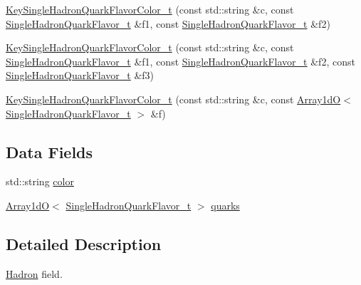 \begin{DoxyCompactItemize}
\item 
\mbox{\hyperlink{structHadron_1_1KeySingleHadronQuarkFlavorColor__t_a1a1acbb421e0eee78a6102a9dc7027b6}{Key\+Single\+Hadron\+Quark\+Flavor\+Color\+\_\+t}} (const std\+::string \&c, const \mbox{\hyperlink{structHadron_1_1SingleHadronQuarkFlavor__t}{Single\+Hadron\+Quark\+Flavor\+\_\+t}} \&f1, const \mbox{\hyperlink{structHadron_1_1SingleHadronQuarkFlavor__t}{Single\+Hadron\+Quark\+Flavor\+\_\+t}} \&f2)
\item 
\mbox{\hyperlink{structHadron_1_1KeySingleHadronQuarkFlavorColor__t_aa59b67de7070dc5fcab6ef768af7069e}{Key\+Single\+Hadron\+Quark\+Flavor\+Color\+\_\+t}} (const std\+::string \&c, const \mbox{\hyperlink{structHadron_1_1SingleHadronQuarkFlavor__t}{Single\+Hadron\+Quark\+Flavor\+\_\+t}} \&f1, const \mbox{\hyperlink{structHadron_1_1SingleHadronQuarkFlavor__t}{Single\+Hadron\+Quark\+Flavor\+\_\+t}} \&f2, const \mbox{\hyperlink{structHadron_1_1SingleHadronQuarkFlavor__t}{Single\+Hadron\+Quark\+Flavor\+\_\+t}} \&f3)
\item 
\mbox{\hyperlink{structHadron_1_1KeySingleHadronQuarkFlavorColor__t_aa894166327f6565a8ec49fd863dadf47}{Key\+Single\+Hadron\+Quark\+Flavor\+Color\+\_\+t}} (const std\+::string \&c, const \mbox{\hyperlink{classADAT_1_1Array1dO}{Array1dO}}$<$ \mbox{\hyperlink{structHadron_1_1SingleHadronQuarkFlavor__t}{Single\+Hadron\+Quark\+Flavor\+\_\+t}} $>$ \&f)
\end{DoxyCompactItemize}
\subsection*{Data Fields}
\begin{DoxyCompactItemize}
\item 
std\+::string \mbox{\hyperlink{structHadron_1_1KeySingleHadronQuarkFlavorColor__t_aa5dc10dee689bef8e65d2b9230efdc85}{color}}
\item 
\mbox{\hyperlink{classADAT_1_1Array1dO}{Array1dO}}$<$ \mbox{\hyperlink{structHadron_1_1SingleHadronQuarkFlavor__t}{Single\+Hadron\+Quark\+Flavor\+\_\+t}} $>$ \mbox{\hyperlink{structHadron_1_1KeySingleHadronQuarkFlavorColor__t_ac52e7989b620c4733cc2e960394fd0fd}{quarks}}
\end{DoxyCompactItemize}


\subsection{Detailed Description}
\mbox{\hyperlink{namespaceHadron}{Hadron}} field. 

